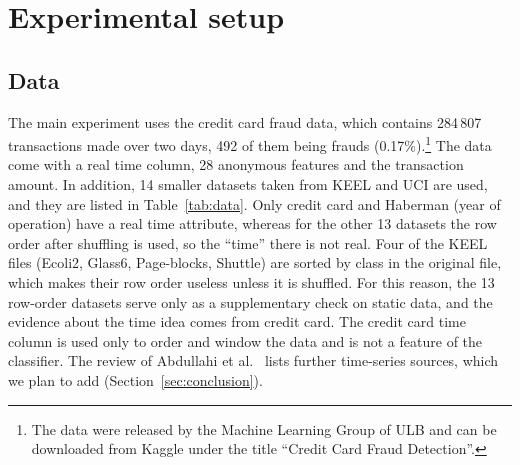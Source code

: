 \documentclass[preprint,10pt]{elsarticle}
\let\OldSubsection\subsection
\renewcommand{\subsection}{\OldSubsection}
\begin{document}
\section{Experimental setup}\label{sec:setup}
\subsection{Data}
The main experiment uses the credit card fraud data, which contains 284\,807 transactions made over two days, 492 of them being frauds (0.17\%).\footnote{The data were released by the Machine Learning Group of ULB and can be downloaded from Kaggle under the title ``Credit Card Fraud Detection''.} The data come with a real time column, 28 anonymous features and the transaction amount. In addition, 14 smaller datasets taken from KEEL and UCI are used, and they are listed in Table~\ref{tab:data}. Only credit card and Haberman (year of operation) have a real time attribute, whereas for the other 13 datasets the row order after shuffling is used, so the ``time'' there is not real. Four of the KEEL files (Ecoli2, Glass6, Page-blocks, Shuttle) are sorted by class in the original file, which makes their row order useless unless it is shuffled. For this reason, the 13 row-order datasets serve only as a supplementary check on static data, and the evidence about the time idea comes from credit card. The credit card time column is used only to order and window the data and is not a feature of the classifier. The review of Abdullahi et al.~\cite{abdullahi2025} lists further time-series sources, which we plan to add (Section~\ref{sec:conclusion}).
\end{document}
